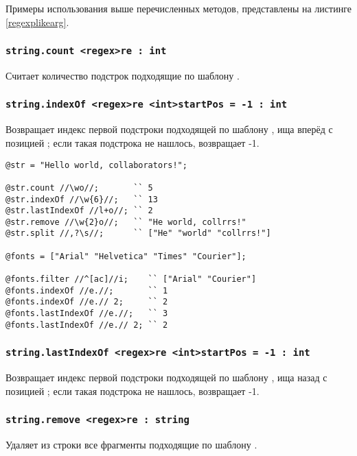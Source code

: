Примеры использования выше перечисленных методов, представлены на листинге \ref{regexplikearg}.

\subsubsection{\lstinline|string.count <regex>re : int|}

Считает количество подстрок подходящие по шаблону .

\subsubsection{\lstinline|string.indexOf <regex>re <int>startPos = -1 : int|}

Возвращает индекс первой подстроки подходящей по шаблону , ища вперёд с позицией ; если такая подстрока не нашлось, возвращает -1.

\begin{lstlisting}[caption=Регулярные выражения в качестве аргумента, label=regexplikearg]
@str = "Hello world, collaborators!";

@str.count //\wo//;       `` 5
@str.indexOf //\w{6}//;   `` 13
@str.lastIndexOf //l+o//; `` 2
@str.remove //\w{2}o//;   `` "He world, collrrs!"
@str.split //,?\s//;      `` ["He" "world" "collrrs!"]

@fonts = ["Arial" "Helvetica" "Times" "Courier"];

@fonts.filter //^[ac]//i;    `` ["Arial" "Courier"]
@fonts.indexOf //e.//;       `` 1
@fonts.indexOf //e.// 2;     `` 2
@fonts.lastIndexOf //e.//;   `` 3
@fonts.lastIndexOf //e.// 2; `` 2
\end{lstlisting}

\subsubsection{\lstinline|string.lastIndexOf <regex>re <int>startPos = -1 : int|}

Возвращает индекс первой подстроки подходящей по шаблону , ища назад с позицией ; если такая подстрока не нашлось, возвращает -1.

\subsubsection{\lstinline|string.remove <regex>re : string|}

Удаляет из строки все фрагменты подходящие по шаблону .

